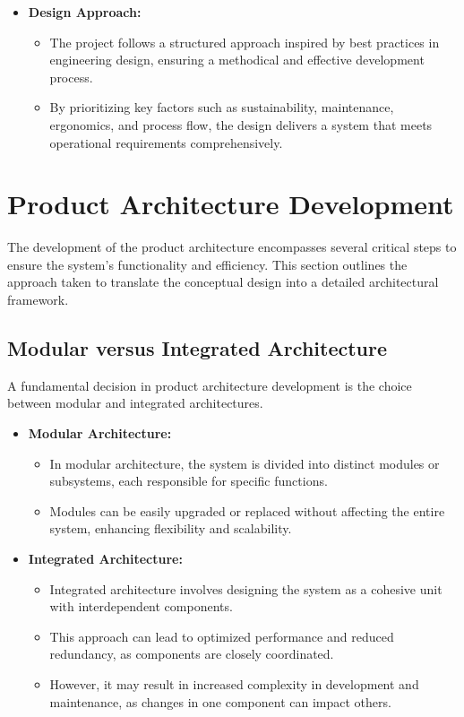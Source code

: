 \documentclass[12pt]{report}
\begin{document}
\begin{itemize}
    \item \textbf{Design Approach:}
    \begin{itemize}
        \item The project follows a structured approach inspired by best practices in engineering design, ensuring a methodical and effective development process.
        \item By prioritizing key factors such as sustainability, maintenance, ergonomics, and process flow, the design delivers a system that meets operational requirements comprehensively.
    \end{itemize}
\end{itemize}


\section{Product Architecture Development}
\label{sec:product_architecture}

The development of the product architecture encompasses several critical steps to ensure the system's functionality and efficiency. This section outlines the approach taken to translate the conceptual design into a detailed architectural framework.

\subsection{Modular versus Integrated Architecture}
\label{subsec:architecture_types}

A fundamental decision in product architecture development is the choice between modular and integrated architectures. 

\begin{itemize}
    \item \textbf{Modular Architecture:}
    \begin{itemize}
        \item In modular architecture, the system is divided into distinct modules or subsystems, each responsible for specific functions.
        \item Modules can be easily upgraded or replaced without affecting the entire system, enhancing flexibility and scalability.
    \end{itemize}
    
    \item \textbf{Integrated Architecture:}
    \begin{itemize}
        \item Integrated architecture involves designing the system as a cohesive unit with interdependent components.
        \item This approach can lead to optimized performance and reduced redundancy, as components are closely coordinated.
        \item However, it may result in increased complexity in development and maintenance, as changes in one component can impact others.
    \end{itemize}
\end{itemize}
\end{document}
